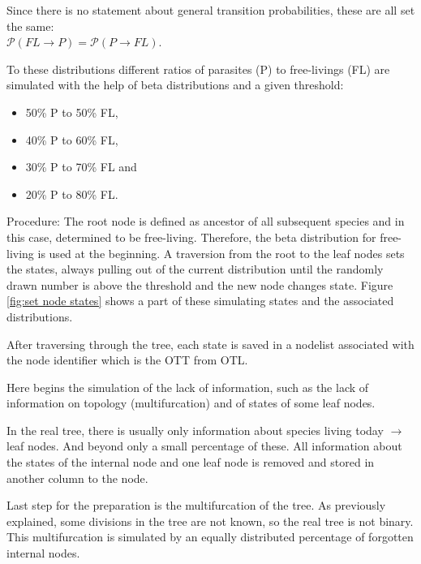     Since there is no statement about general transition probabilities, these are all set the same: \\
    $\mathcal{P}(FL \rightarrow P) = \mathcal{P}(P \rightarrow FL)$.

    To these distributions different ratios of parasites (P) to free-livings (FL) are simulated with 
      the help of beta distributions and a given threshold:
      \begin{itemize}
        \item 50\% P to 50\% FL,
        \item 40\% P to 60\% FL,
        \item 30\% P to 70\% FL and 
        \item 20\% P to 80\% FL.
      \end{itemize}

    Procedure: The root node is defined as ancestor of all subsequent species and in this case, 
      determined to be free-living. Therefore, the beta distribution for free-living is used at the 
      beginning. A traversion from the root to the leaf nodes sets the states, always pulling out of 
      the current distribution until the randomly drawn number is above the threshold and the new node 
      changes state. Figure \ref{fig:set node states} shows a part of these simulating states and the 
      associated distributions.

    After traversing through the tree, each state is saved in a nodelist associated with the node 
      identifier which is the OTT from OTL.

    Here begins the simulation of the lack of information, such as the lack of information on topology 
      (multifurcation) and of states of some leaf nodes.

    In the real tree, there is usually only information about species living today $\rightarrow$ leaf 
      nodes. And beyond only a small percentage of these. All information about the states of the 
      internal node and one leaf node is removed and stored in another column to the node.

    Last step for the preparation is the multifurcation of the tree. As previously explained, some 
      divisions in the tree are not known, so the real tree is not binary. This multifurcation is 
      simulated by an equally distributed percentage of forgotten internal nodes.
    
